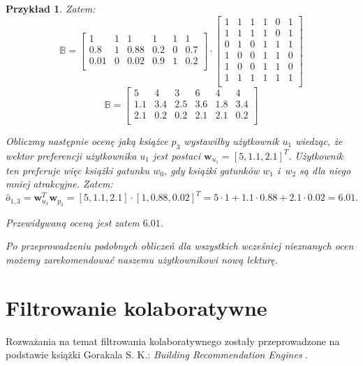 \documentclass[12pt,a4paper]{report}
\newtheorem{przyklad}{Przykład}[chapter]{\normalfont}
\begin{document}
\begin{przyklad}
Zatem:
$$
\mathbb{B} = \left[
        \begin{array}{cccccc}
         1 & 1 & 1 & 1 & 1 & 1 \\
         0.8 & 1 & 0.88 & 0.2 & 0 & 0.7 \\
         0.01 & 0 & 0.02 & 0.9 & 1 & 0.2 \\
         \end{array}
      \right] \cdot \left[
        \begin{array}{cccccc}
         1 & 1 & 1 & 1 & 0 & 1 \\
         1 & 1 & 1 & 1 & 0 & 1 \\
         0 & 1 & 0 & 1 & 1 & 1 \\
         1 & 0 & 0 & 1 & 1 & 0 \\
         1 & 0 & 0 & 1 & 1 & 0 \\
         1 & 1 & 1 & 1 & 1 & 1 \\
         \end{array}
      \right] $$
      $$ \mathbb{B} = \left[
        \begin{array}{cccccc}
         5 & 4 & 3 & 6 & 4 & 4 \\
         1.1 & 3.4 & 2.5 & 3.6 & 1.8 & 3.4 \\
         2.1 & 0.2 & 0.2 & 2.1 & 2.1 & 0.2 \\
         \end{array}
      \right]$$

\bigskip
Obliczmy następnie ocenę jaką książce $p_3$ wystawiłby użytkownik $u_1$ wiedząc, że wektor preferencji użytkownika $u_1$ jest postaci $\mathbf{w}_{u_1}= [5,1.1,2.1]^T$. Użytkownik ten preferuje więc książki gatunku $w_0$, gdy książki gatunków $w_1$ i~$w_2$ są dla niego mniej atrakcyjne.
Zatem:
$$
\widehat{o}_{1,3} = \mathbf{w}_{u_1}^T \mathbf{w}_{p_3} = [5,1.1,2.1] \cdot [1, 0.88, 0.02] ^ T = 5 \cdot 1 + 1.1 \cdot 0.88 + 2.1 \cdot 0.02 = 6.01.
$$

Przewidywaną oceną jest zatem $6.01$. 

Po przeprowadzeniu podobnych obliczeń dla wszystkich wcześniej nieznanych ocen możemy zarekomendować naszemu użytkownikowi nową lekturę.
\end{przyklad}


\section{Filtrowanie kolaboratywne}
Rozważania na temat filtrowania kolaboratywnego zostały przeprowadzone na podstawie książki Gorakala S. K.: \textit{Building Recommendation Engines} {\citep[Sec 3]{bre}}.
\bigskip
\end{document}
